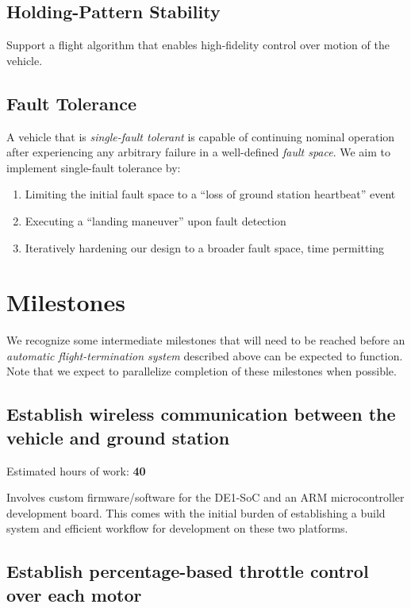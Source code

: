 \documentclass{article}
\begin{document}
\subsection{Holding-Pattern Stability}

Support a flight algorithm that enables high-fidelity control over
motion of the vehicle.

\subsection{Fault Tolerance}

A vehicle that is \textit{single-fault tolerant} is capable of continuing
nominal operation after experiencing any arbitrary failure in a well-defined
\textit{fault space}. We aim to implement single-fault tolerance by:

\begin{enumerate}
	\item Limiting the initial fault space to a ``loss of ground station
		heartbeat'' event
	\item Executing a ``landing maneuver'' upon fault detection
	\item Iteratively hardening our design to a broader fault space,
		time permitting
\end{enumerate}

\section{Milestones}

\noindent We recognize some intermediate milestones that will need to be reached
before an \textit{automatic flight-termination system} described above can be
expected to function. Note that we expect to parallelize completion of these
milestones when possible.

\subsection{Establish wireless communication between the vehicle and ground station}

Estimated hours of work: \textbf{40}
\vspace{0.25cm}

\noindent
Involves custom firmware/software for the DE1-SoC and an ARM microcontroller
development board. This comes with the initial burden of establishing a
build system and efficient workflow for development on these two platforms.

\subsection{Establish percentage-based throttle control over each motor}
\end{document}
